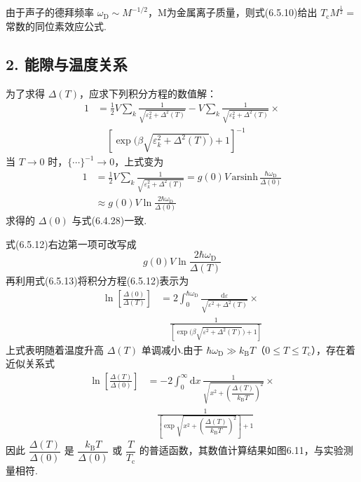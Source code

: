 由于声子的德拜频率 $\omega_{\mathrm{D}}\sim M^{-1/2}$，M为金属离子质量，则式(6.5.10)给出 $T_{\mathrm{c}}M^{\frac{1}{2}}=$ 常数的同位素效应公式.

\subsection*{2. 能隙与温度关系}

为了求得 $\Delta(T)$，应求下列积分方程的数值解：
\begin{equation}
\begin{aligned}
  1&=\frac{1}{2}V\sum_{k}\frac{1}{\sqrt{\varepsilon_{k}^{2}+\Delta^{2}(T)}}
  -V\sum_{k}\frac{1}{\sqrt{\varepsilon_{k}^{2}+\Delta^{2}(T)}}\times\\
  &\quad\left[\exp\bigl(\beta\sqrt{\varepsilon_{k}^{2}+\Delta^{2}(T)}\bigr)+1\right]^{-1}
\end{aligned}
\end{equation}
当 $T\to0$ 时，$\{\cdots\}^{-1}\to0$，上式变为
\begin{equation}
\begin{aligned}
  1&=\frac{1}{2}V\sum_{k}\frac{1}{\sqrt{\varepsilon_{k}^{2}+\Delta^{2}(T)}}
  =g(0)V\,\mathrm{arsinh}\,\frac{\hbar\omega_{\mathrm{D}}}{\Delta(0)}\\
  &\approx g(0)V\ln\frac{2\hbar\omega_{\mathrm{D}}}{\Delta(0)}
\end{aligned}
\end{equation}
求得的 $\Delta(0)$ 与式(6.4.28)一致.

式(6.5.12)右边第一项可改写成
\begin{equation*}
  g(0)V\ln\frac{2\hbar\omega_{\mathrm{D}}}{\Delta(T)}
\end{equation*}
再利用式(6.5.13)将积分方程(6.5.12)表示为
\begin{equation}
\begin{aligned}
  \ln\left[\frac{\Delta(0)}{\Delta(T)}\right]
  &=2\int_{0}^{\hbar\omega_{\mathrm{D}}}
  \frac{\mathrm{d}\varepsilon}{\sqrt{\varepsilon^{2}+\Delta^{2}(T)}}\times\\
  &\quad\frac{1}{\left[\exp\bigl(\beta\sqrt{\varepsilon^{2}+\Delta^{2}(T)}\bigr)+1\right]}
\end{aligned}
\end{equation}
上式表明随着温度升高 $\Delta(T)$ 单调减小.由于 $\hbar\omega_{\mathrm{D}}\gg k_{\mathrm{B}}T$（$0\leqslant T\leqslant T_{\mathrm{c}}$），存在着近似关系式
\begin{equation}
\begin{aligned}
  \ln\left[\frac{\Delta(T)}{\Delta(0)}\right]
  &=-2\int_{0}^{\infty}\mathrm{d}x\,
  \frac{1}{\sqrt{x^{2}+\left(\dfrac{\Delta(T)}{k_{\mathrm{B}}T}\right)^{2}}}\times\\
  &\quad\frac{1}{\left[\exp\sqrt{x^{2}+\left(\dfrac{\Delta(T)}{k_{\mathrm{B}}T}\right)^{2}}\right]+1}
\end{aligned}
\end{equation}
因此 $\dfrac{\Delta(T)}{\Delta(0)}$ 是 $\dfrac{k_{\mathrm{B}}T}{\Delta(0)}$ 或 $\dfrac{T}{T_{\mathrm{c}}}$ 的普适函数，其数值计算结果如图6.11，与实验测量相符.

